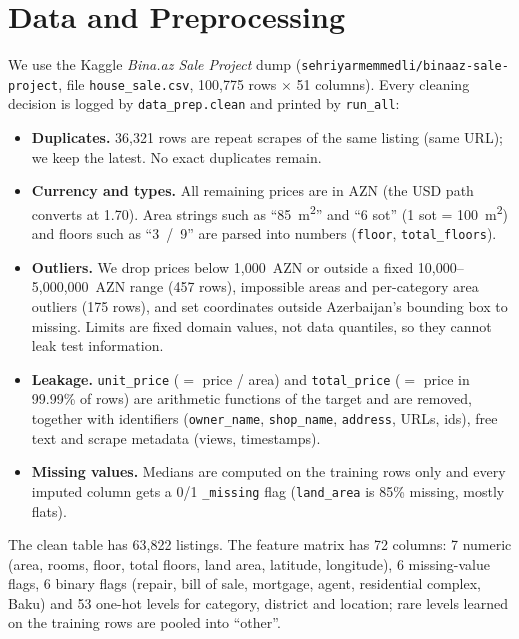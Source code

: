 \documentclass[10pt,twocolumn,a4paper]{article}
\newcommand{\code}[1]{\texttt{#1}}
\begin{document}
\section{Data and Preprocessing}\label{sec:data}
We use the Kaggle \emph{Bina.az Sale Project} dump
(\code{sehriyarmemmedli/binaaz-sale-project}, file \code{house\_sale.csv},
100,775 rows $\times$ 51 columns). Every cleaning decision is logged by
\code{data\_prep.clean} and printed by \code{run\_all}:
\begin{itemize}\setlength\itemsep{0pt}
  \item \textbf{Duplicates.} 36,321 rows are repeat scrapes of the same
        listing (same URL); we keep the latest. No exact duplicates remain.
  \item \textbf{Currency and types.} All remaining prices are in AZN (the
        USD path converts at 1.70). Area strings such as ``85~m\textsuperscript{2}''
        and ``6 sot'' (1 sot = 100~m\textsuperscript{2}) and floors such as
        ``3~/~9'' are parsed into numbers (\code{floor}, \code{total\_floors}).
  \item \textbf{Outliers.} We drop prices below 1,000~AZN or outside a
        fixed 10,000--5,000,000~AZN range (457 rows), impossible areas and
        per-category area outliers (175 rows), and set coordinates outside
        Azerbaijan's bounding box to missing. Limits are fixed domain
        values, not data quantiles, so they cannot leak test information.
  \item \textbf{Leakage.} \code{unit\_price} ($=$ price / area) and
        \code{total\_price} ($=$ price in 99.99\% of rows) are arithmetic
        functions of the target and are removed, together with identifiers
        (\code{owner\_name}, \code{shop\_name}, \code{address}, URLs, ids),
        free text and scrape metadata (views, timestamps).
  \item \textbf{Missing values.} Medians are computed on the training rows
        only and every imputed column gets a 0/1 \code{\_missing} flag
        (\code{land\_area} is 85\% missing, mostly flats).
\end{itemize}
The clean table has 63,822 listings. The feature matrix has 72 columns:
7 numeric (area, rooms, floor, total floors, land area, latitude,
longitude), 6 missing-value flags, 6 binary flags (repair, bill of sale,
mortgage, agent, residential complex, Baku) and 53 one-hot levels for
category, district and location; rare levels learned on the training rows
are pooled into ``other''.
\end{document}
